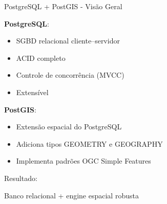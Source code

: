 \documentclass{beamer}
\begin{document}
\begin{frame}{PostgreSQL + PostGIS - Visão Geral}
    
    \textbf{PostgreSQL}:
    \begin{itemize}
        \item SGBD relacional cliente–servidor
        \item ACID completo
        \item Controle de concorrência (MVCC)
        \item Extensível
    \end{itemize}
    
    \vspace{0.4cm}
    
    \textbf{PostGIS}:
    \begin{itemize}
        \item Extensão espacial do PostgreSQL
        \item Adiciona tipos GEOMETRY e GEOGRAPHY
        \item Implementa padrões OGC Simple Features
    \end{itemize}
    
    \vspace{0.4cm}
    
    Resultado:
    \begin{center}
        Banco relacional + engine espacial robusta
    \end{center}
    
\end{frame}
\end{document}
